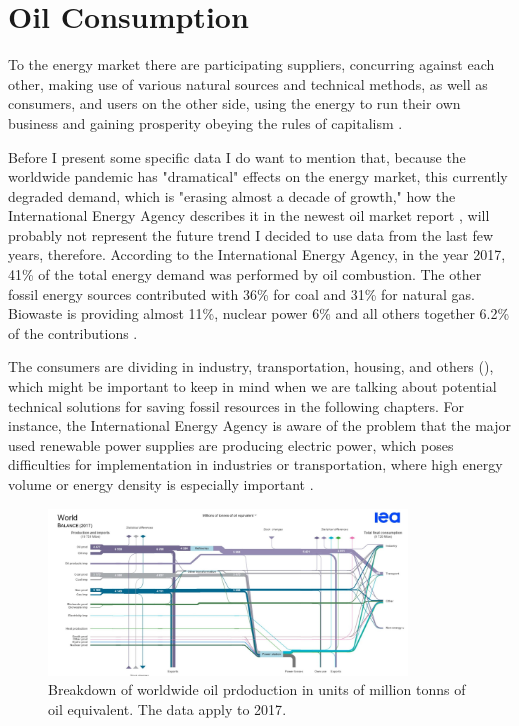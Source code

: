 \section{Oil Consumption}
To the energy market there are participating suppliers, concurring against each other, 
making use of various natural sources and technical methods, as well as consumers, and users on the other
side, using the energy to run their own business and gaining prosperity obeying the rules of capitalism \cite{capitalism}.
\par
Before I present some specific data I do want to mention that, because the worldwide pandemic has "dramatical" \cite[3]{IEAApril} effects on the energy market, 
this currently degraded demand, which is "erasing almost a decade of growth," how the International Energy Agency describes it in the newest oil market report \cite{IEAApril},
will probably not represent the future trend I decided to use data from the last few years, therefore.
According to the International Energy Agency, in the year 2017, 41\% of the total energy demand was performed by oil combustion.
The other fossil energy sources contributed with 36\% for coal and 31\% for natural gas. 
Biowaste is providing almost 11\%, nuclear power 6\% and all others together 6.2\% of the contributions \cite{WEO_P_C}.
\par
The consumers are dividing in industry, transportation, housing, and others (), which might be important to keep in mind
when we are talking about potential technical solutions for saving fossil resources in the following chapters.
For instance, the International Energy Agency is aware of the problem
that the major used renewable power supplies are producing electric power,
which poses difficulties for implementation in industries or transportation, 
where high energy volume or energy density is especially important \cite{IEA_Industries}.

\begin{figure}
  \centering
  \includegraphics[width=0.85\textwidth]{graphics/IEA_Prod_and_Cons_2017.jpg}
  \caption{Breakdown of worldwide oil prdoduction in units of million tonns of oil equivalent. The data apply to 2017\cite{WEO_P_C}.}
  \label{fig:IEA_production}
\end{figure}

